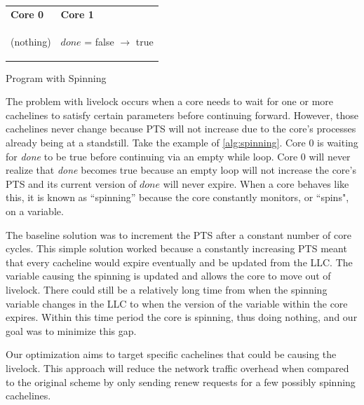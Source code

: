 \documentclass[12pt]{article}
\begin{document}
	\begin{center} 
		
		\begin{tabular}{p{5cm} p{5cm}}
			\textbf{Core 0} & \textbf{Core 1} \\
			\begin{algorithm}[H]
				\While{!done}
				{(nothing)}
				
			\end{algorithm}
			&
			\begin{algorithm}[H]
				$done$ = false $\rightarrow$  true
			\end{algorithm}
			\\
		\end{tabular}
		\begin{algorithm}
			\caption{Program with Spinning}\label{alg:spinning}
		\end{algorithm}
	\end{center}
	The problem with livelock occurs when a core needs to wait for one or 
	more cachelines to satisfy certain parameters before continuing 
	forward. However, those cachelines never change because PTS will not  
	increase due to the core's processes already being at a standstill. Take  the example of \cref{alg:spinning}. Core 0 is waiting for \textit{done} to  
	be true before continuing via an empty while loop. Core 0 will never 
	realize that \textit{done} becomes true because an empty loop will not increase 
	the core's PTS and its current version of $done$ will never expire. When a core behaves like this, it is known as 
	``spinning'' because the core constantly monitors, or ``spins", on a 
	variable. 
	
	The baseline solution was to increment the PTS after a constant number 
	of core cycles. This simple solution worked because a constantly 
	increasing PTS meant that every cacheline would expire eventually and 
	be updated from the LLC. The variable causing the spinning is updated 
	and allows the core to move out of livelock. There could still be 
	a relatively long time from when the spinning variable changes in the 
	LLC to when the version of the variable within the core expires.  
	Within this time period the core is spinning, thus doing nothing, and 
	our goal was to minimize this gap. 
	
	
	Our optimization aims to target specific cachelines that could be 
	causing the livelock. This approach will reduce the network traffic 
	overhead when compared to the original scheme by only sending renew 
	requests for a few possibly spinning cachelines.
	
\end{document}
